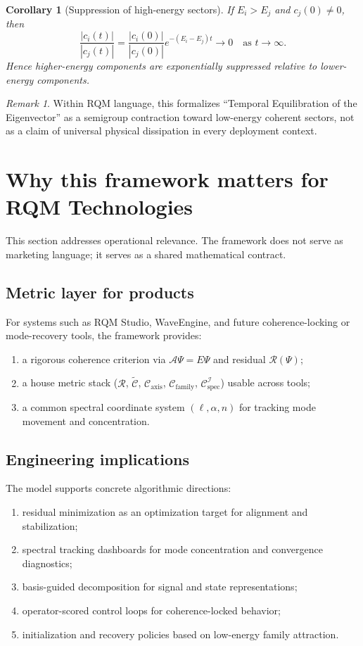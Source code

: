 \documentclass[11pt]{article}
\newtheorem{corollary}[definition]{Corollary}
\theoremstyle{remark}
\newtheorem{remark}[definition]{Remark}
\newcommand{\Aop}{\mathcal{A}}
\newcommand{\Res}{\mathcal{R}}
\newcommand{\COp}{\widetilde{\mathcal{C}}}
\newcommand{\CAxis}{\mathcal{C}_{\mathrm{axis}}}
\newcommand{\CFamily}{\mathcal{C}_{\mathrm{family}}}
\newcommand{\CSpec}{\mathcal{C}_{\mathrm{spec}}}
\begin{document}
\begin{corollary}[Suppression of high-energy sectors]
If $E_i>E_j$ and $c_j(0)\neq 0$, then
\[
\frac{|c_i(t)|}{|c_j(t)|}
=
\frac{|c_i(0)|}{|c_j(0)|}e^{-(E_i-E_j)t}\to 0
\quad\text{as }t\to\infty.
\]
Hence higher-energy components are exponentially suppressed relative to lower-energy components.
\end{corollary}

\begin{remark}
Within RQM language, this formalizes ``Temporal Equilibration of the Eigenvector'' as a semigroup contraction toward low-energy coherent sectors, not as a claim of universal physical dissipation in every deployment context.
\end{remark}

\section{Why this framework matters for RQM Technologies}

This section addresses operational relevance. The framework does not serve as marketing language; it serves as a shared mathematical contract.

\subsection{Metric layer for products}

For systems such as RQM Studio, WaveEngine, and future coherence-locking or mode-recovery tools, the framework provides:
\begin{enumerate}
\item a rigorous coherence criterion via $\Aop\Psi=E\Psi$ and residual $\Res(\Psi)$;
\item a house metric stack ($\Res$, $\COp$, $\CAxis$, $\CFamily$, $\CSpec^{\mathcal{I}}$) usable across tools;
\item a common spectral coordinate system $(\ell,\alpha,n)$ for tracking mode movement and concentration.
\end{enumerate}

\subsection{Engineering implications}

The model supports concrete algorithmic directions:
\begin{enumerate}
\item residual minimization as an optimization target for alignment and stabilization;
\item spectral tracking dashboards for mode concentration and convergence diagnostics;
\item basis-guided decomposition for signal and state representations;
\item operator-scored control loops for coherence-locked behavior;
\item initialization and recovery policies based on low-energy family attraction.
\end{enumerate}
\end{document}

